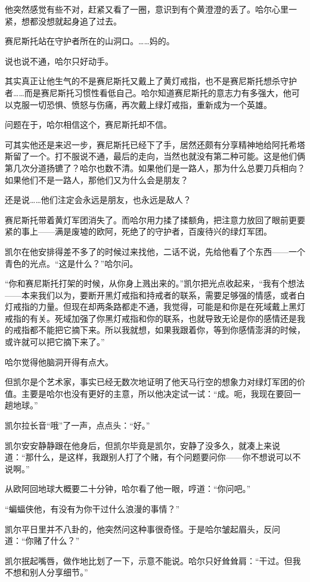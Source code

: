 \documentclass[../main]{subfiles}
\begin{document}
他突然感觉有些不对，赶紧又看了一圈，意识到有个黄澄澄的丢了。哈尔心里一紧，想都没想就起身追了过去。

赛尼斯托站在守护者所在的山洞口。……妈的。

说也说不通，哈尔只好动手。

其实真正让他生气的不是赛尼斯托又戴上了黄灯戒指，也不是赛尼斯托想杀守护者……而是赛尼斯托习惯性看低自己。哈尔知道赛尼斯托的意志力有多强大，他可以克服一切恐惧、愤怒与伤痛，再次戴上绿灯戒指，重新成为一个英雄。

问题在于，哈尔相信这个，赛尼斯托却不信。

可其实他还是来迟一步，赛尼斯托已经下了手，居然还颇有分享精神地给阿托希塔斯留了一个。打不服说不通，最后的走向，当然也就没有第二种可能。这是他们俩第几次分道扬镳了？哈尔也数不清。如果他们是一路人，那为什么总要刀兵相向？如果他们不是一路人，那他们又为什么会是朋友？

还是说……他们注定会永远是朋友，也永远是敌人？

赛尼斯托带着黄灯军团消失了。而哈尔用力揉了揉额角，把注意力放回了眼前更要紧的事上——满是废墟的欧阿，死绝了的守护者，百废待兴的绿灯军团。

凯尔在他安排得差不多了的时候过来找他，二话不说，先给他看了个东西——一个青色的光点。“这是什么？”哈尔问。

“你和赛尼斯托打架的时候，从你身上溅出来的。”凯尔把光点收起来，“我有个想法——本来我们以为，要断开黑灯戒指和持戒者的联系，需要足够强的情感，或者白灯戒指的力量。但现在却两条路都走不通，我觉得，可能是和你是在死域戴上黑灯戒指的有关。死域加强了你黑灯戒指和你的联系，也就导致无论是你的感情还是我的戒指都不能把它摘下来。所以我就想，如果我跟着你，等到你感情澎湃的时候，或许就可以把它摘下来了。”

哈尔觉得他脑洞开得有点大。

但凯尔是个艺术家，事实已经无数次地证明了他天马行空的想象力对绿灯军团的价值。主要是哈尔也没有更好的主意，所以他决定试一试：“成。呃，我现在要回一趟地球。”

凯尔拉长音“哦”了一声，点点头：“好。”

凯尔安安静静跟在他身后，但凯尔毕竟是凯尔，安静了没多久，就凑上来说道：“那什么，是这样，我跟别人打了个赌，有个问题要问你——你不想说可以不说啊。”

从欧阿回地球大概要二十分钟，哈尔看了他一眼，哼道：“你问吧。”

“蝙蝠侠他，有没有为你干过什么浪漫的事情？”

凯尔平日里并不八卦的，他突然问这种事很奇怪。于是哈尔皱起眉头，反问道：“你赌了什么？”

凯尔抿起嘴唇，做作地比划了一下，示意不能说。哈尔只好耸耸肩：“干过。但我不想和别人分享细节。”
\end{document}
